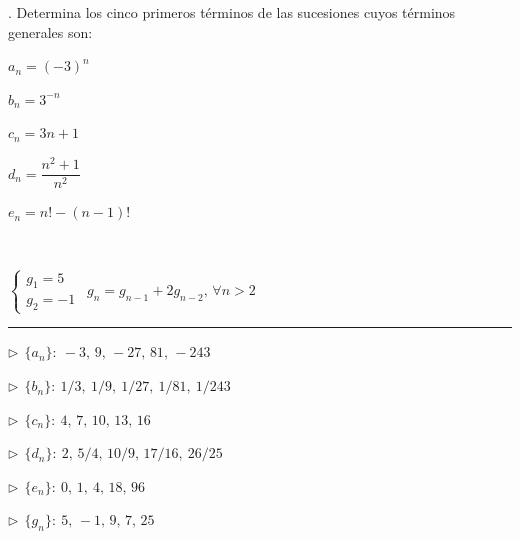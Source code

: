\begin{miejercicio}
. \normalsize{Determina} los cinco primeros términos de las sucesiones cuyos términos generales son:

\begin{multicols}{2}
$a_n=(-3)^n$

$b_n=3^{-n}$

$c_n=3n+1$

$d_n=\dfrac{n^2+1}{n^2}$

$e_n=n!-(n-1)!$

$\quad$

$\begin{cases} g_1=5 \\ g_2=-1\end{cases} \ \ g_n=g_{n-1}+2g_{n-
2},\, \forall n>2$	
\end{multicols}

\rule{250pt}{0.1pt}

\begin{multicols}{2}
\vspace{2mm} $\triangleright \ \ \{a_n\}:\ -3,\, 9,\, -27,\, 81,\, -243$

\vspace{2mm} $\triangleright \ \ \{b_n\}:\ 1/3,\ 1/9,\ 1/27,\ 1/81,\ 1/243$

\vspace{2mm} $\triangleright \ \ \{c_n\}:\ 4,\, 7,\, 10,\, 13,\, 16$

\vspace{2mm} $\triangleright \ \ \{d_n\}:\ 2,\, 5/4,\, 10/9,\, 17/16,\ 26/25$

\vspace{2mm} $\triangleright \ \ \{e_n\}:\ 0,\, 1,\ 4,\, 18,\, 96$

\vspace{2mm} $\triangleright \ \ \{g_n\}:\ 5,\, -1,\, 9,\, 7,\, 25$
\end{multicols}
	
\end{miejercicio}


